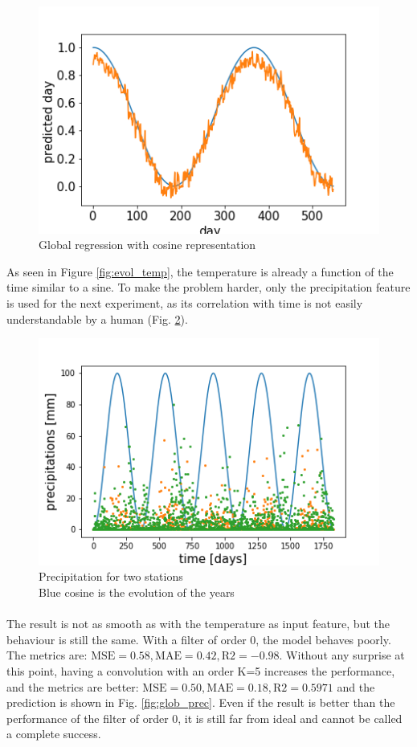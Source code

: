 \documentclass[11pt]{report}
\begin{document}
\begin{figure}[!ht]
    \centering
    \includegraphics[width=0.5\linewidth]{figures/global_cos_results.png}
    \caption{Global regression with cosine representation}
    \label{fig:glob_cos}
\end{figure}

As seen in Figure \ref{fig:evol_temp}, the temperature is already a function of the time similar to a sine. To make the problem harder, only the precipitation feature is used for the next experiment, as its correlation with time is not easily understandable by a human (Fig. \ref{fig:prec_time}).

\begin{figure}[!ht]
    \centering
    \includegraphics[width=0.5\linewidth]{figures/prec_time.png}
    \caption{Precipitation for two stations\\Blue cosine is the evolution of the years}
    \label{fig:prec_time}
\end{figure}

\paragraph*{}
The result is not as smooth as with the temperature as input feature, but the behaviour is still the same. With a filter of order 0, the model behaves poorly. The metrics are: $\textrm{MSE} = 0.58, \textrm{MAE} = 0.42, \textrm{R2} = -0.98$. Without any surprise at this point, having a convolution with an order K=5 increases the performance, and the metrics are better: $\textrm{MSE} = 0.50, \textrm{MAE} = 0.18, \textrm{R2} = 0.5971$ and the prediction is shown in Fig. \ref{fig:glob_prec}. Even if the result is better than the performance of the filter of order 0, it is still far from ideal and cannot be called a complete success.
\end{document}
